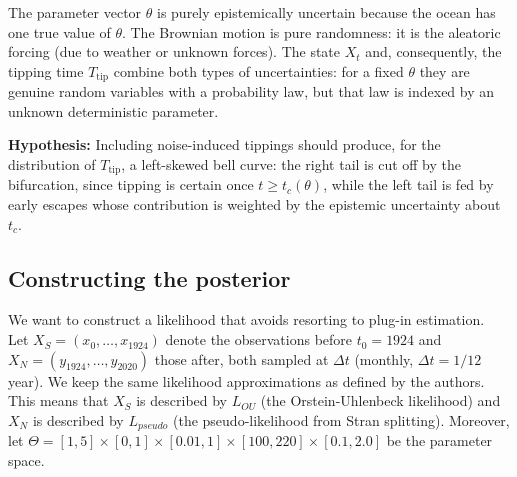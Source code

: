\documentclass[12pt,a4paper]{article}
\theoremstyle{definition}
\theoremstyle{plain}
\newcommand{\Ttip}{T_{\mathrm{tip}}}
\begin{document}
\noindent The parameter vector $\theta$ is purely epistemically uncertain because the ocean has one true value of $\theta$. The Brownian motion is pure randomness:
it is the aleatoric forcing (due to weather or unknown forces). The state $X_t$ and, consequently, the tipping time
$\Ttip$ combine both types of uncertainties: for a fixed $\theta$ they are genuine random variables with a probability law, but that law is indexed by an unknown deterministic parameter. \\

\begin{tcolorbox}
\center \textbf{Hypothesis:} Including noise-induced tippings should produce, for the
distribution of $\Ttip$, a left-skewed bell curve: the right tail is cut off by the bifurcation, since tipping is certain
once $t\ge t_c(\theta)$, while the left tail is fed by early escapes whose contribution is
weighted by the epistemic uncertainty about $t_c$.
\end{tcolorbox}

\subsection{Constructing the posterior}
\label{sec:posterior}



We want to construct a likelihood that avoids resorting to plug-in estimation. \\

\noindent Let $X_S=(x_0,\dots,x_{1924})$ denote the observations before $t_0=1924$ and
$X_N=(y_{1924},\dots,y_{2020})$ those after, both sampled at $\Delta t$ (monthly, $\Delta t=1/12$ year). We keep the same likelihood approximations as defined by the authors. This means that $X_S$ is described by $L_{OU}$ (the Orstein-Uhlenbeck likelihood) and $X_N$ is described by $L_{pseudo}$ (the pseudo-likelihood from Stran splitting). Moreover, let $\Theta = [1, 5] \times [0, 1] \times [0.01, 1] \times [100, 220] \times [0.1, 2.0] $ be the parameter space. \\
\end{document}
